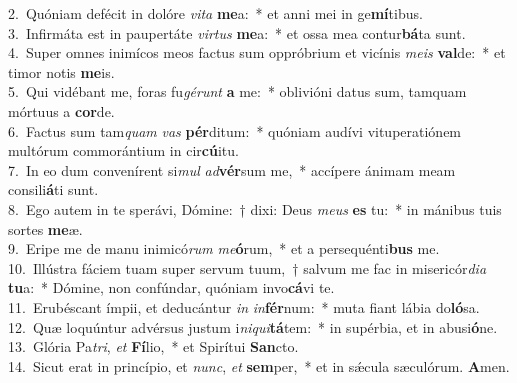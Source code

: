 {2.~}Quóniam defécit in dolóre \textit{vi}\textit{ta} \textbf{me}a:~* et anni mei in ge\textbf{mí}tibus.\\
{3.~}Infirmáta est in paupertáte \textit{vir}\textit{tus} \textbf{me}a:~* et ossa mea contur\textbf{bá}ta sunt.\\
{4.~}Super omnes inimícos meos factus sum oppróbrium et vicínis \textit{me}\textit{is} \textbf{val}de:~* et timor notis \textbf{me}is.\\
{5.~}Qui vidébant me, foras fu\textit{gé}\textit{runt} \textbf{a} me:~* oblivióni datus sum, tamquam mórtuus a \textbf{cor}de.\\
{6.~}Factus sum tam\textit{quam} \textit{vas} \textbf{pér}ditum:~* quóniam audívi vituperatiónem multórum commorántium in cir\textbf{cú}itu.\\
{7.~}In eo dum convenírent si\textit{mul} \textit{ad}\textbf{vér}sum me,~* accípere ánimam meam consili\textbf{á}ti sunt.\\
{8.~}Ego autem in te sperávi, Dómine:~† dixi: Deus \textit{me}\textit{us} \textbf{es} tu:~* in mánibus tuis sortes \textbf{me}æ.\\
{9.~}Eripe me de manu inimicó\textit{rum} \textit{me}\textbf{ó}rum,~* et a persequénti\textbf{bus} me.\\
{10.~}Illústra fáciem tuam super servum tuum,~† salvum me fac in misericór\textit{di}\textit{a} \textbf{tu}a:~* Dómine, non confúndar, quóniam invo\textbf{cá}vi te.\\
{11.~}Erubéscant ímpii, et deducántur \textit{in} \textit{in}\textbf{fér}num:~* muta fiant lábia do\textbf{ló}sa.\\
{12.~}Quæ loquúntur advérsus justum i\textit{ni}\textit{qui}\textbf{tá}tem:~* in supérbia, et in abusi\textbf{ó}ne.\\
{13.~}Glória Pa\textit{tri}, \textit{et} \textbf{Fí}lio,~* et Spirítui \textbf{San}cto.\\
{14.~}Sicut erat in princípio, et \textit{nunc}, \textit{et} \textbf{sem}per,~* et in sǽcula sæculórum. \textbf{A}men.\\
